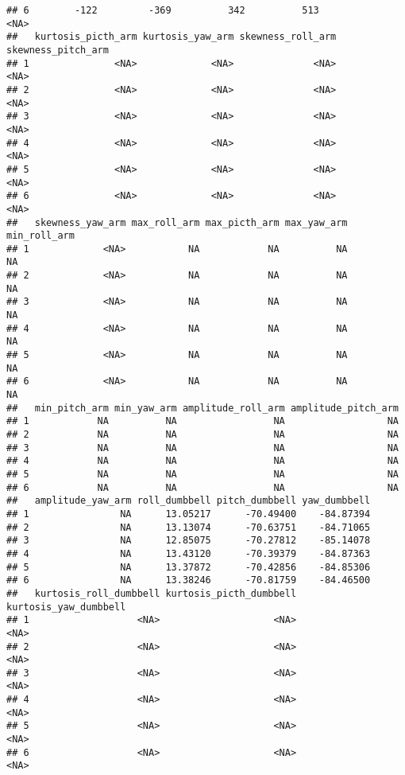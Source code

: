\documentclass[
]{article}
\begin{document}
\begin{verbatim}
## 6        -122         -369          342          513              <NA>
##   kurtosis_picth_arm kurtosis_yaw_arm skewness_roll_arm skewness_pitch_arm
## 1               <NA>             <NA>              <NA>               <NA>
## 2               <NA>             <NA>              <NA>               <NA>
## 3               <NA>             <NA>              <NA>               <NA>
## 4               <NA>             <NA>              <NA>               <NA>
## 5               <NA>             <NA>              <NA>               <NA>
## 6               <NA>             <NA>              <NA>               <NA>
##   skewness_yaw_arm max_roll_arm max_picth_arm max_yaw_arm min_roll_arm
## 1             <NA>           NA            NA          NA           NA
## 2             <NA>           NA            NA          NA           NA
## 3             <NA>           NA            NA          NA           NA
## 4             <NA>           NA            NA          NA           NA
## 5             <NA>           NA            NA          NA           NA
## 6             <NA>           NA            NA          NA           NA
##   min_pitch_arm min_yaw_arm amplitude_roll_arm amplitude_pitch_arm
## 1            NA          NA                 NA                  NA
## 2            NA          NA                 NA                  NA
## 3            NA          NA                 NA                  NA
## 4            NA          NA                 NA                  NA
## 5            NA          NA                 NA                  NA
## 6            NA          NA                 NA                  NA
##   amplitude_yaw_arm roll_dumbbell pitch_dumbbell yaw_dumbbell
## 1                NA      13.05217      -70.49400    -84.87394
## 2                NA      13.13074      -70.63751    -84.71065
## 3                NA      12.85075      -70.27812    -85.14078
## 4                NA      13.43120      -70.39379    -84.87363
## 5                NA      13.37872      -70.42856    -84.85306
## 6                NA      13.38246      -70.81759    -84.46500
##   kurtosis_roll_dumbbell kurtosis_picth_dumbbell kurtosis_yaw_dumbbell
## 1                   <NA>                    <NA>                  <NA>
## 2                   <NA>                    <NA>                  <NA>
## 3                   <NA>                    <NA>                  <NA>
## 4                   <NA>                    <NA>                  <NA>
## 5                   <NA>                    <NA>                  <NA>
## 6                   <NA>                    <NA>                  <NA>

\end{verbatim}
\end{document}
